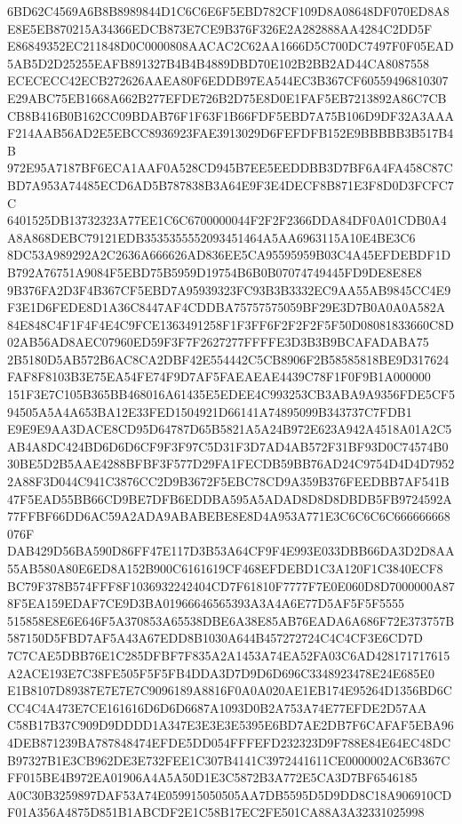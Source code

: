 \documentclass[UTF8,fontset=fandol,zihao=-4,a4paper]{ctexart}
\begin{document}
{{6BD62C4569A6B8B8989844D1C6C6E6F5EBD782CF109D8A08648DF070ED8A8E8E5EB870215A34366EDCB873E7CE9B376F326E2A282888AA4284C2DD5F
E86849352EC211848D0C0000808AACAC2C62AA1666D5C700DC7497F0F05EAD5AB5D2D25255EAFB891327B4B4B4889DBD70E102B2BB2AD44CA8087558
ECECECC42ECB272626AAEA80F6EDDB97EA544EC3B367CF60559496810307E29ABC75EB1668A662B277EFDE726B2D75E8D0E1FAF5EB7213892A86C7CB
CB8B416B0B162CC09BDAB76F1F63F1B66FDF5EBD7A75B106D9DF32A3AAAF214AAB56AD2E5EBCC8936923FAE3913029D6FEFDFB152E9BBBBB3B517B4B
972E95A7187BF6ECA1AAF0A528CD945B7EE5EEDDBB3D7BF6A4FA458C87CBD7A953A74485ECD6AD5B787838B3A64E9F3E4DECF8B871E3F8D0D3FCFC7C
6401525DB13732323A77EE1C6C6700000044F2F2F2366DDA84DF0A01CDB0A4A8A868DEBC79121EDB3535355552093451464A5AA6963115A10E4BE3C6
8DC53A989292A2C2636A666626AD836EE5CA95595959B03C4A45EFDEBDF1DB792A76751A9084F5EBD75B5959D19754B6B0B07074749445FD9DE8E8E8
9B376FA2D3F4B367CF5EBD7A95939323FC93B3B3332EC9AA55AB9845CC4E9F3E1D6FEDE8D1A36C8447AF4CDDBA75757575059BF29E3D7B0A0A0A582A
84E848C4F1F4F4E4C9FCE1363491258F1F3FF6F2F2F2F5F50D08081833660C8D02AB56AD8AEC07960ED59F3F7F2627277FFFFE3D3B3B9BCAFADABA75
2B5180D5AB572B6AC8CA2DBF42E554442C5CB8906F2B58585818BE9D317624FAF8F8103B3E75EA54FE74F9D7AF5FAEAEAE4439C78F1F0F9B1A000000
151F3E7C105B365BB468016A61435E5EDEE4C993253CB3ABA9A9356FDE5CF594505A5A4A653BA12E33FED1504921D66141A74895099B343737C7FDB1
E9E9E9AA3DACE8CD95D64787D65B5821A5A24B972E623A942A4518A01A2C5AB4A8DC424BD6D6D6CF9F3F97C5D31F3D7AD4AB572F31BF93D0C74574B0
30BE5D2B5AAE4288BFBF3F577D29FA1FECDB59BB76AD24C9754D4D4D79522A88F3D044C941C3876CC2D9B3672F5EBC78CD9A359B376FEEDBB7AF541B
47F5EAD55BB66CD9BE7DFB6EDDBA595A5ADAD8D8D8DBDB5FB9724592A77FFBF66DD6AC59A2ADA9ABABEBE8E8D4A953A771E3C6C6C6C666666668076F
DAB429D56BA590D86FF47E117D3B53A64CF9F4E993E033DBB66DA3D2D8AA55AB580A80E6ED8A152B900C6161619CF468EFDEBD1C3A120F1C3840ECF8
BC79F378B574FFF8F1036932242404CD7F61810F7777F7E0E060D8D7000000A878F5EA159EDAF7CE9D3BA01966646565393A3A4A6E77D5AF5F5F5555
515858E8E6E646F5A370853A65538DBE6A38E85AB76EADA6A686F72E373757B587150D5FBD7AF5A43A67EDD8B1030A644B457272724C4C4CF3E6CD7D
7C7CAE5DBB76E1C285DFBF7F835A2A1453A74EA52FA03C6AD428171717615A2ACE193E7C38FE505F5F5FB4DDA3D7D9D6D696C3348923478E24E685E0
E1B8107D89387E7E7E7C9096189A8816F0A0A020AE1EB174E95264D1356BD6CCC4C4A473E7CE161616D6D6D6687A1093D0B2A753A74E77EFDE2D57AA
C58B17B37C909D9DDDD1A347E3E3E3E5395E6BD7AE2DB7F6CAFAF5EBA964DEB871239BA787848474EFDE5DD054FFFEFD232323D9F788E84E64EC48DC
B97327B1E3CB962DE3E732FEE1C307B4141C3972441611CE0000002AC6B367CFF015BE4B972EA01906A4A5A50D1E3C5872B3A772E5CA3D7BF6546185
A0C30B3259897DAF53A74E059915050505AA7DB5595D5D9DD8C18A906910CDF01A356A4875D851B1ABCDF2E1C58B17EC2FE501CA88A3A32331025998
}}
\end{document}
